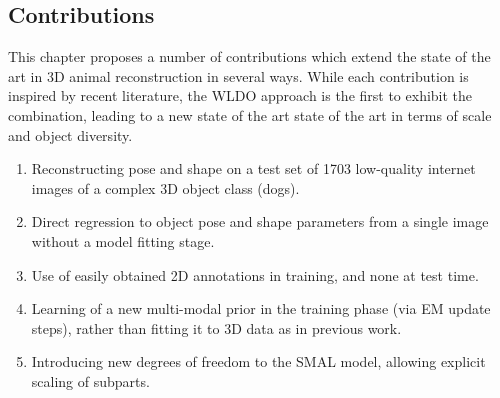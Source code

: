 \subsection{Contributions}

This chapter proposes a number of contributions which extend the state of the art in 3D animal reconstruction in several ways. While each contribution is inspired by recent literature, the WLDO approach is the first to exhibit the combination, leading to a new state of the art state of the art in terms of scale and object diversity.

\begin{enumerate}
    \item Reconstructing pose and shape on a test set of 1703 low-quality internet images of a complex 3D object class (dogs).
    \item Direct regression to object pose and shape parameters from a single image without a model fitting stage.
    \item Use of easily obtained 2D annotations in training, and none at test time.
    \item Learning of a new multi-modal prior in the training phase (via EM update steps), rather than fitting it to 3D data as in previous work.
    \item Introducing new degrees of freedom to the SMAL model, allowing explicit scaling of subparts.
\end{enumerate}

